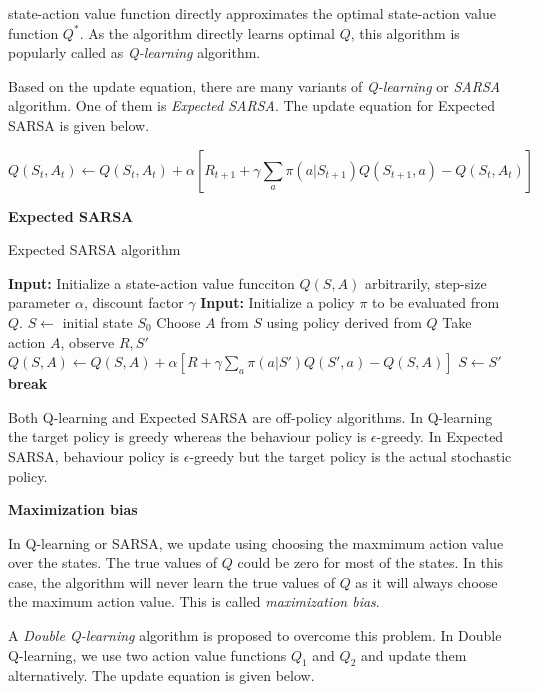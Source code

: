 \documentclass[../main.tex]{subfiles}
\begin{document}
state-action value function directly approximates the optimal state-action value function $Q^*$. As the algorithm directly learns optimal $Q$, this algorithm is popularly called as \emph{Q-learning} algorithm.

Based on the update equation, there are many variants of \emph{Q-learning} or \emph{SARSA} algorithm. One of them is \emph{Expected SARSA}. The update equation for Expected SARSA is given below.

\begin{equation}
Q(S_t, A_t) \leftarrow Q(S_t, A_t) + \alpha \left[ R_{t+1} + \gamma \sum_a \pi(a|S_{t+1}) Q(S_{t+1}, a) - Q(S_t, A_t) \right] \nonumber
\end{equation}

\textbf{Expected SARSA}

\begin{algorithm}[H]
\caption{Expected SARSA algorithm}
\begin{algorithmic}[1]
    \State \textbf{Input:} Initialize a state-action value funcciton $Q(S, A)$ arbitrarily, step-size parameter $\alpha$, discount factor $\gamma$
\State \textbf{Input:} Initialize a policy $\pi$ to be evaluated from $Q$.
\State  $S \leftarrow$ initial state $S_0$
\State Choose $A$ from $S$ using policy derived from $Q$ 
\State  Take action $A$, observe $R, S'$
\State  $Q(S, A) \leftarrow Q(S, A) + \alpha \left[ R + \gamma \sum_a \pi(a|S') Q(S', a) - Q(S, A) \right]$
\State  $S \leftarrow S'$
\State \textbf{break}
\EndIf
\EndFor
\EndWhile
\end{algorithmic}
\end{algorithm}


Both Q-learning and Expected SARSA are off-policy algorithms.  In Q-learning the target policy is greedy whereas the behaviour policy is $\epsilon$-greedy. In Expected SARSA, behaviour policy is $\epsilon$-greedy but the target policy is the actual stochastic policy.

\textbf{Maximization bias}

In Q-learning or SARSA, we update using choosing the maxmimum action value over the states. The true values of $Q$ could be zero for most of the states. In this case, the algorithm will never learn the true values of $Q$ as it will always choose the maximum action value. This is called \emph{maximization bias}.

A \emph{Double Q-learning} algorithm is proposed to overcome this problem. In Double Q-learning, we use two action value functions $Q_1$ and $Q_2$ and update them alternatively. The update equation is given below.
\end{document}
